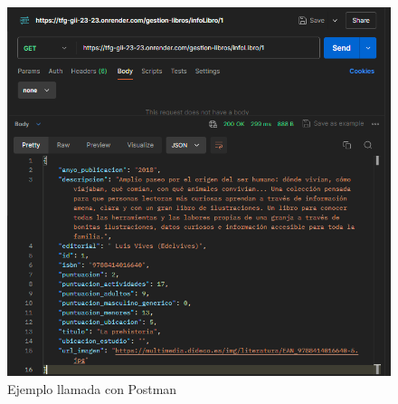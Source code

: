 \begin{figure}[h]
    \centering
    \includegraphics[width=0.7\linewidth]{Imagenes/PostmanEjemplo.png}
    \caption{Ejemplo llamada con Postman}
    \label{Ejemplo llamada con Postman}
\end{figure}
\FloatBarrier